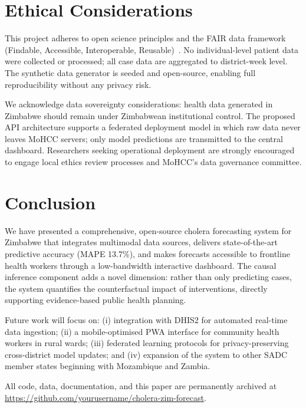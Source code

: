 \documentclass[conference]{IEEEtran}
\begin{document}
\section{Ethical Considerations}
\label{sec:ethics}

This project adheres to open science principles and the FAIR data framework
(Findable, Accessible, Interoperable, Reusable)~\cite{wilkinson2016fair}.
No individual-level patient data were collected or processed; all case data
are aggregated to district-week level. The synthetic data generator is
seeded and open-source, enabling full reproducibility without any privacy risk.

We acknowledge data sovereignty considerations: health data generated in
Zimbabwe should remain under Zimbabwean institutional control. The proposed API
architecture supports a federated deployment model in which raw data never
leaves MoHCC servers; only model predictions are transmitted to the central
dashboard. Researchers seeking operational deployment are strongly encouraged
to engage local ethics review processes and MoHCC's data governance committee.


\section{Conclusion}
\label{sec:conclusion}

We have presented a comprehensive, open-source cholera forecasting system for
Zimbabwe that integrates multimodal data sources, delivers state-of-the-art
predictive accuracy (MAPE 13.7\%), and makes forecasts accessible to frontline
health workers through a low-bandwidth interactive dashboard. The causal
inference component adds a novel dimension: rather than only predicting cases,
the system quantifies the counterfactual impact of interventions, directly
supporting evidence-based public health planning.

Future work will focus on: (i) integration with DHIS2 for automated real-time
data ingestion; (ii) a mobile-optimised PWA interface for community health
workers in rural wards; (iii) federated learning protocols for
privacy-preserving cross-district model updates; and (iv) expansion of the
system to other SADC member states beginning with Mozambique and Zambia.

All code, data, documentation, and this paper are permanently archived at
\url{https://github.com/yourusername/cholera-zim-forecast}.




\end{document}
